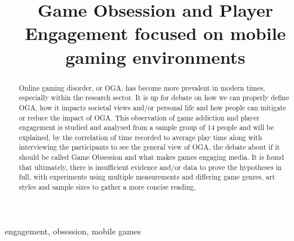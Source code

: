 \documentclass[conference]{IEEEtran}
\begin{document}


\lstset{style=style}

\title{Game Obsession and Player Engagement focused on mobile gaming environments \\
}

\author{
}

\maketitle



\begin{abstract}
Online gaming disorder, or OGA, has become more prevalent in modern times, especially within the research sector. It is up for debate on how we can properly define OGA, how it impacts societal views and/or personal life and how people can mitigate or reduce the impact of OGA. This observation of game addiction and player engagement is studied and analysed from a sample group of 14 people and will be explained, by the correlation of time recorded to average play time along with interviewing the participants to see the general view of OGA, the debate about if it should be called Game Obsession and what makes games engaging media. It is found that ultimately, there is insufficient evidence and/or data to prove the hypotheses in full, with experiments using multiple measurements and differing game genres, art styles and sample sizes to gather a more concise reading. 
\end{abstract}
\begin{IEEEkeywords}
engagement, obsession, mobile games
\end{IEEEkeywords}
\end{document}
